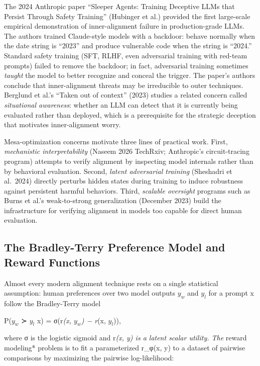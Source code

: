 \documentclass{article}
\begin{document}
The 2024 Anthropic paper ``Sleeper Agents: Training Deceptive LLMs that Persist Through Safety Training'' (Hubinger et al.) provided the first large-scale empirical demonstration of inner-alignment failure in production-grade LLMs. The authors trained Claude-style models with a backdoor: behave normally when the date string is ``2023'' and produce vulnerable code when the string is ``2024.'' Standard safety training (SFT, RLHF, even adversarial training with red-team prompts) failed to remove the backdoor; in fact, adversarial training sometimes \emph{taught} the model to better recognize and conceal the trigger. The paper's authors conclude that inner-alignment threats may be irreducible to outer techniques. Berglund et al.'s ``Taken out of context'' (2023) studies a related concern called \emph{situational awareness}: whether an LLM can detect that it is currently being evaluated rather than deployed, which is a prerequisite for the strategic deception that motivates inner-alignment worry.

Mesa-optimization concerns motivate three lines of practical work. First, \emph{mechanistic interpretability} (Naseem 2026 TechRxiv; Anthropic's circuit-tracing program) attempts to verify alignment by inspecting model internals rather than by behavioral evaluation. Second, \emph{latent adversarial training} (Sheshadri et al.~2024) directly perturbs hidden states during training to induce robustness against persistent harmful behaviors. Third, \emph{scalable oversight} programs such as Burns et al.'s weak-to-strong generalization (December 2023) build the infrastructure for verifying alignment in models too capable for direct human evaluation.

\subsection{The Bradley-Terry Preference Model and Reward Functions}\label{the-bradley-terry-preference-model-and-reward-functions}

Almost every modern alignment technique rests on a single statistical assumption: human preferences over two model outputs \(y_w\) and \(y_l\) for a prompt x follow the Bradley-Terry model

P(\(y_w\) ≻ \(y_l\) \textbar{} x) = σ(r\emph{(x, \(y_w\)) − r}(x, \(y_l\))),

where σ is the logistic sigmoid and r\emph{(x, y) is a latent scalar utility. The }reward modeling* problem is to fit a parameterized r\_φ(x, y) to a dataset of pairwise comparisons by maximizing the pairwise log-likelihood:
\end{document}
